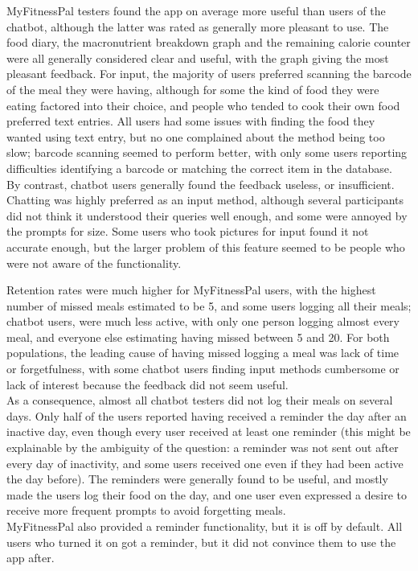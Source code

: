 MyFitnessPal testers found the app on average more useful than users of the chatbot, although the latter was rated as generally more pleasant to use. The food diary, the macronutrient breakdown graph and the remaining calorie counter were all generally considered clear and useful, with the graph giving the most pleasant feedback. For input, the majority of users preferred scanning the barcode of the meal they were having, although for some the kind of food they were eating factored into their choice, and people who tended to cook their own food preferred text entries. All users had some issues with finding the food they wanted using text entry, but no one complained about the method being too slow; barcode scanning seemed to perform better, with only some users reporting difficulties identifying a barcode or matching the correct item in the database. \\
By contrast, chatbot users generally found the feedback useless, or insufficient. Chatting was highly preferred as an input method, although several participants did not think it understood their queries well enough, and some were annoyed by the prompts for size. Some users who took pictures for input found it not accurate enough, but the larger problem of this feature seemed to be people who were not aware of the functionality.

Retention rates were much higher for MyFitnessPal users, with the highest number of missed meals estimated to be 5, and some users logging all their meals; chatbot users, were much less active, with only one person logging almost every meal, and everyone else estimating having missed between 5 and 20. For both populations, the leading cause of having missed logging a meal was lack of time or forgetfulness, with some chatbot users finding input methods cumbersome or lack of interest because the feedback did not seem useful. \\
As a consequence, almost all chatbot testers did not log their meals on several days. Only half of the users reported having received a reminder the day after an inactive day, even though every user received at least one reminder (this might be explainable by the ambiguity of the question: a reminder was not sent out after every day of inactivity, and some users received one even if they had been active the day before). The reminders were generally found to be useful, and mostly made the users log their food on the day, and one user even expressed a desire to receive more frequent prompts to avoid forgetting meals. \\
MyFitnessPal also provided a reminder functionality, but it is off by default. All users who turned it on got a reminder, but it did not convince them to use the app after. 

